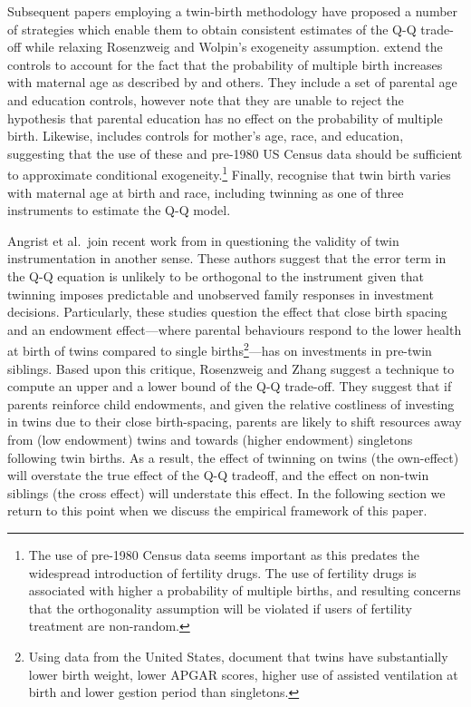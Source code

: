 \documentclass{article}[11pt,subeqn]
\begin{document}
\begin{spacing}{1.5}
Subsequent papers employing a twin-birth methodology have proposed a number of strategies which enable them to obtain consistent estimates of 
the Q-Q trade-off while relaxing Rosenzweig and Wolpin's exogeneity assumption.  \citet{Blacketal2005} extend the controls to account for the 
fact that the probability of multiple birth increases with maternal age as described by \citet{Jacobsenetal1999} and others.  They include a 
set of parental age and education controls, however note that they are unable to reject the hypothesis that parental education has no effect 
on the probability of multiple birth.  Likewise, \citet{Caceres2006} includes controls for mother's age, race, and education, suggesting that 
the use of these and pre-1980 US Census data should be sufficient to approximate conditional exogeneity.\footnote{The use of pre-1980 Census 
data seems important as this predates the widespread introduction of fertility drugs.  The use of fertility drugs is associated with higher a 
probability of multiple births, and resulting concerns that the orthogonality assumption will be violated if users of fertility treatment are 
non-random.}  Finally, \citet{Angristetal2010} recognise that twin birth varies with maternal age at birth and race, including twinning as 
one of three instruments to estimate the Q-Q model. 

Angrist et al.\ join recent work from \citet{RosenzweigZhang2009} in questioning the validity of twin instrumentation in another sense.  These 
authors suggest that the error term in the Q-Q equation is unlikely to be orthogonal to the instrument given that twinning imposes predictable 
and unobserved family responses in investment decisions.  Particularly, these studies question the effect that close birth spacing and an endowment 
effect---where parental behaviours respond to the lower health at birth of twins compared to single births\footnote{Using data from the United States, \citet{Almondetal2005} 
document that twins have substantially lower birth weight, lower APGAR scores, higher use of assisted ventilation at birth and lower gestion period 
than singletons.}---has on investments in pre-twin siblings.  Based upon this critique, Rosenzweig and Zhang suggest a technique to compute an upper 
and a lower bound of the Q-Q trade-off.  They suggest that if parents reinforce child endowments, and given the relative costliness of investing
in twins due to their close birth-spacing, parents are likely to shift resources away from (low endowment) twins and towards 
(higher endowment) singletons following twin births.  As a result, the effect of twinning on twins (the own-effect) will overstate the true effect of the Q-Q tradeoff, 
and the effect on non-twin siblings (the cross effect) will understate this effect.  In the following section we return to this point when we discuss
the empirical framework of this paper.


\end{spacing}
\end{document}
